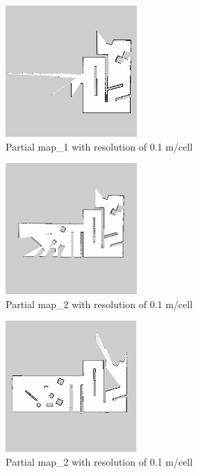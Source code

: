 \begin{figure}[H]
\begin{subfigure}{0.5\textwidth}
\includegraphics[width=0.9\linewidth, height=5cm]{figs/simulation_results/c/partial_map_1.jpg} 
\caption{Partial map\_1 with resolution of 0.1 m/cell}
\label{fig:sim31}
\end{subfigure}
\begin{subfigure}{0.5\textwidth}
\includegraphics[width=0.9\linewidth, height=5cm]{figs/simulation_results/c/partial_map_2.jpg} 
\caption{Partial map\_2 with resolution of 0.1 m/cell}
\label{fig:sim32}
\end{subfigure}
\begin{subfigure}{0.5\textwidth}
\includegraphics[width=0.9\linewidth, height=5cm]{figs/simulation_results/c/partial_map_3.jpg} 
\caption{Partial map\_2 with resolution of 0.1 m/cell}
\label{fig:sim33}
\end{subfigure}
\begin{subfigure}{0.5\textwidth}
\centering

\end{subfigure}
\end{figure}

